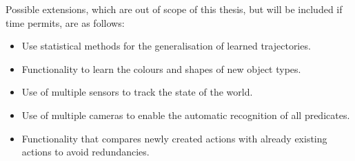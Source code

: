 Possible extensions, which are out of scope of this thesis, but will be included if time permits, are as follows:
\begin{itemize}
	\item Use statistical methods for the generalisation of learned trajectories.
	\item Functionality to learn the colours and shapes of new object types.
	\item Use of multiple sensors to track the state of the world.
	\item Use of multiple cameras to enable the automatic recognition of all predicates.
	\item Functionality that compares newly created actions with already existing actions to avoid redundancies.
\end{itemize}